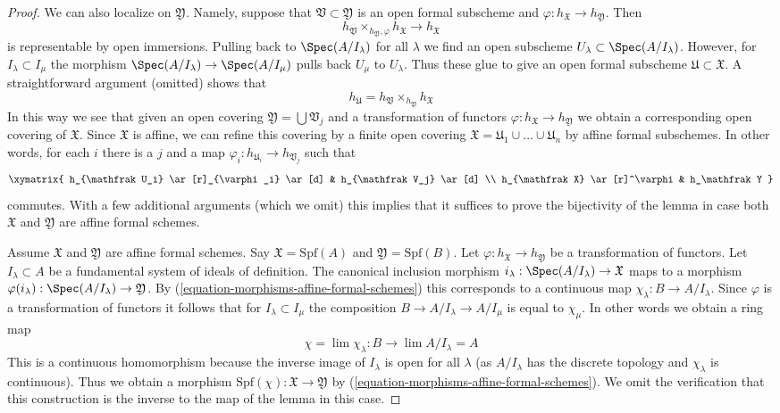 \begin{proof}
\medskip\noindent
We can also localize on $\mathfrak Y$.
Namely, suppose that $\mathfrak V \subset \mathfrak Y$ is an
open formal subscheme and $\varphi : h_\mathfrak X \to h_\mathfrak Y$.
Then
$$
h_\mathfrak V \times_{h_\mathfrak Y, \varphi} h_\mathfrak X \to h_\mathfrak X
$$
is representable by open immersions. Pulling back to
$\Spec(A/I_\lambda)$ for all $\lambda$ we find an open subscheme
$U_\lambda \subset \Spec(A/I_\lambda)$. However, for
$I_\lambda \subset I_\mu$ the morphism $\Spec(A/I_\lambda) \to \Spec(A/I_\mu)$
pulls back $U_\mu$ to $U_\lambda$. Thus these glue to give
an open formal subscheme $\mathfrak U \subset \mathfrak X$.
A straightforward argument (omitted) shows that
$$
h_\mathfrak U = h_\mathfrak V \times_{h_\mathfrak Y} h_\mathfrak X
$$
In this way we see that given an open covering
$\mathfrak Y = \bigcup \mathfrak V_j$ and a transformation
of functors $\varphi :  h_\mathfrak X \to h_\mathfrak Y$
we obtain a corresponding open covering of $\mathfrak X$.
Since $\mathfrak X$ is affine, we can refine this covering by
a finite open covering
$\mathfrak X = \mathfrak U_1 \cup \ldots \cup \mathfrak U_n$
by affine formal subschemes. In other words, for each $i$ there
is a $j$ and a map $\varphi_i : h_{\mathfrak U_i} \to h_{\mathfrak V_j}$
such that
$$
\xymatrix{
h_{\mathfrak U_i} \ar[r]_{\varphi_i} \ar[d] & h_{\mathfrak V_j} \ar[d] \\
h_{\mathfrak X} \ar[r]^\varphi & h_\mathfrak Y
}
$$
commutes. With a few additional arguments (which we omit) this implies
that it suffices to prove the bijectivity of the lemma in case
both $\mathfrak X$ and $\mathfrak Y$ are affine formal schemes.

\medskip\noindent
Assume $\mathfrak X$ and $\mathfrak Y$ are affine formal schemes.
Say $\mathfrak X = \text{Spf}(A)$ and $\mathfrak Y = \text{Spf}(B)$.
Let $\varphi : h_\mathfrak X \to h_\mathfrak Y$ be a transformation
of functors. Let $I_\lambda \subset A$ be a fundamental system of
ideals of definition. The canonical inclusion morphism
$i_\lambda : \Spec(A/I_\lambda) \to \mathfrak X$ maps to a morphism
$\varphi(i_\lambda) : \Spec(A/I_\lambda) \to \mathfrak Y$.
By (\ref{equation-morphisms-affine-formal-schemes}) this corresponds
to a continuous map $\chi_\lambda : B \to A/I_\lambda$.
Since $\varphi$ is a transformation of functors it follows
that for $I_\lambda \subset I_\mu$ the composition
$B \to A/I_\lambda \to A/I_\mu$ is equal to $\chi_\mu$.
In other words we obtain a ring map
$$
\chi = \lim \chi_\lambda : B \longrightarrow \lim A/I_\lambda = A
$$
This is a continuous homomorphism because the inverse image
of $I_\lambda$ is open for all $\lambda$ (as $A/I_\lambda$ has the discrete
topology and $\chi_\lambda$ is continuous). Thus we obtain
a morphism $\text{Spf}(\chi) : \mathfrak X \to \mathfrak Y$ by
(\ref{equation-morphisms-affine-formal-schemes}).
We omit the verification that this construction is the inverse
to the map of the lemma in this case.


\end{proof}
